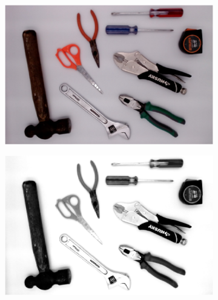 \documentclass[a4paper, 11pt]{article}
\begin{document}
\begin{figure}[h]
  \centering
  \begin{subfigure}{0.45\linewidth}
    \includegraphics[width=\linewidth]{paso1} 
    \caption{}
    \label{fig:1a}
  \end{subfigure}\hfill
  \begin{subfigure}{0.45\linewidth}
    \includegraphics[width=\linewidth]{paso2}
    \caption{}
    \label{fig:1a}
  \end{subfigure}
  

\end{figure}
\end{document}
